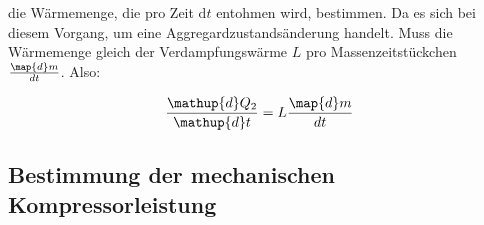 die Wärmemenge, die pro Zeit $\mathup{d}t$ entohmen wird, bestimmen.
Da es sich bei diesem Vorgang, um eine Aggregardzustandsänderung handelt.
Muss die Wärmemenge gleich der Verdampfungswärme $L$ pro Massenzeitstückchen $\frac{\map{d}m}{dt}$.
Also:

\begin{equation*}
\frac{\mathup{d} Q_2}{\mathup{d} t}=L\frac{\map{d}m}{dt}
\end{equation*}

\subsection{Bestimmung der mechanischen Kompressorleistung}



